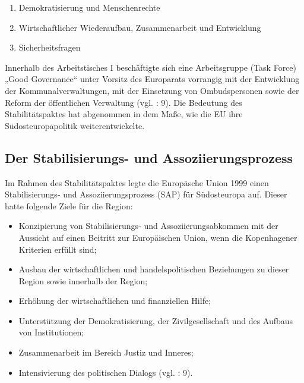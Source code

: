 \begin{enumerate}[label=Tisch {\Roman*}:,align=left,  leftmargin=*]
\item Demokratisierung und Menschenrechte
\item Wirtschaftlicher Wiederaufbau, Zusammenarbeit und Entwicklung
\item Sicherheitsfragen
\end{enumerate}
Innerhalb des Arbeitstisches I beschäftigte sich eine Arbeitsgruppe (Task Force) „Good Governance“ unter Vorsitz des Europarats vorrangig mit der Entwicklung der Kommunalverwaltungen, mit der Einsetzung von Ombudspersonen sowie der Reform der öffentlichen Verwaltung (vgl. \cite{calic01} : 9). Die Bedeutung des Stabilitätspaktes hat abgenommen in dem Maße, wie die EU ihre Südosteuropapolitik weiterentwickelte.

\subsection{Der Stabilisierungs- und Assoziierungsprozess}
Im Rahmen des Stabilitätspaktes legte die Europäsche Union 1999 einen Stabilisierungs- und Assoziierungsprozess (SAP) für Südosteuropa auf. Dieser hatte folgende Ziele für die Region:
\begin{itemize} \itemsep1pt \parskip0pt 
\item Konzipierung von Stabilisierungs- und Assoziierungsabkommen mit der Aussicht auf einen
Beitritt zur Europäischen Union, wenn die Kopenhagener Kriterien erfüllt sind;
\item Ausbau der wirtschaftlichen und handelspolitischen Beziehungen zu dieser Region sowie innerhalb der Region;
\item Erhöhung der wirtschaftlichen und finanziellen Hilfe;
\item Unterstützung der Demokratisierung, der Zivilgesellschaft und des Aufbaus von Institutionen;
\item Zusammenarbeit im Bereich Justiz und Inneres;
\item Intensivierung des politischen Dialogs (vgl. \cite{marwedel} : 9).
\end{itemize}

